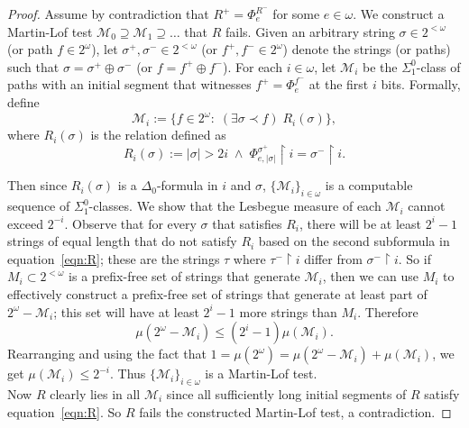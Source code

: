 \documentclass{article}
\begin{document}
\begin{enumerate}
\begin{proof}
      Assume by contradiction that $R^+=\Phi^{R^-}_e$ for some
      $e\in\omega$. We construct a Martin-Lof test
      $\mathcal{M}_0\supseteq\mathcal{M}_1\supseteq\ldots$ that $R$ fails.
      Given an arbitrary string $\sigma\in2^{<\omega}$ (or path
      $f\in2^\omega$), let $\sigma^+,\sigma^-\in2^{<\omega}$
      (or $f^+,f^-\in2^\omega$) denote the strings (or paths) such that
      $\sigma=\sigma^+\oplus\sigma^-$ (or $f=f^+\oplus f^-$).
      For each $i\in\omega$, let $\mathcal{M}_i$ be the $\Sigma_1^0$-class
      of paths with an initial segment that witnesses $f^+=\Phi_e^{f^-}$
      at the first $i$ bits. Formally, define
      \[\mathcal{M}_i :=\{f\in2^\omega:\; (\exists \sigma\prec f)\;
      R_i(\sigma)\},\]
      where $R_i(\sigma)$ is the relation defined as
      \begin{equation}
        R_i(\sigma):= |\sigma|>2i\; \wedge\; \Phi_{e,|\sigma|}^{\sigma^+}
        \restriction i = \sigma^-\restriction i.
        \label{eqn:R}
      \end{equation}

      Then since $R_i(\sigma)$ is a $\Delta_0$-formula in $i$ and $\sigma$,
      $\{\mathcal{M}_i\}_{i\in\omega}$ is a computable sequence of
      $\Sigma_1^0$-classes. We show that the Lesbegue measure of each
      $\mathcal{M}_i$ cannot exceed $2^{-i}$. Observe that for every
      $\sigma$ that satisfies $R_i$, there will be at least $2^{i}-1$
      strings of equal length that do not satisfy $R_i$ based on the second
      subformula in equation~\eqref{eqn:R}; these are the strings $\tau$
      where $\tau^-\restriction i$ differ from $\sigma^-\restriction i$.
      So if $M_i\subset2^{<\omega}$ is a prefix-free set of strings that
      generate $\mathcal{M}_i$, then we can use $M_i$ to
      effectively construct a prefix-free set of strings that generate at
      least part of $2^\omega-\mathcal{M}_i$; this set will have at least
      $2^i-1$ more strings than $M_i$. Therefore
      \[\mu(2^\omega-\mathcal{M}_i) \leq (2^i-1)\mu(\mathcal{M}_i).\]
      Rearranging and using the fact that $1=\mu(2^\omega)
      =\mu(2^\omega-\mathcal{M}_i) +\mu(\mathcal{M}_i)$, we get
      $\mu(\mathcal{M}_i) \leq 2^{-i}$. Thus
      $\{\mathcal{M}_i\}_{i\in\omega}$ is a Martin-Lof test. \\

      Now $R$ clearly lies in all $\mathcal{M}_i$ since all sufficiently
      long initial segments of $R$ satisfy equation~\eqref{eqn:R}. So $R$
      fails the constructed Martin-Lof test, a contradiction.
    \end{proof}
\end{enumerate}
\end{document}
